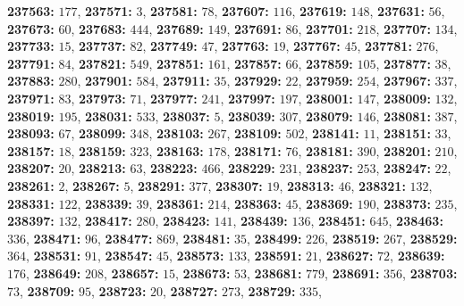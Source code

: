 \textsf{\bfseries 237563:} $177$, \textsf{\bfseries 237571:} $3$, \textsf{\bfseries 237581:} $78$, \textsf{\bfseries 237607:} $116$, \textsf{\bfseries 237619:} $148$, \textsf{\bfseries 237631:} $56$, \textsf{\bfseries 237673:} $60$, \textsf{\bfseries 237683:} $444$, \textsf{\bfseries 237689:} $149$, \textsf{\bfseries 237691:} $86$, \textsf{\bfseries 237701:} $218$, \textsf{\bfseries 237707:} $134$, \textsf{\bfseries 237733:} $15$, \textsf{\bfseries 237737:} $82$, \textsf{\bfseries 237749:} $47$, \textsf{\bfseries 237763:} $19$, \textsf{\bfseries 237767:} $45$, \textsf{\bfseries 237781:} $276$, \textsf{\bfseries 237791:} $84$, \textsf{\bfseries 237821:} $549$, \textsf{\bfseries 237851:} $161$, \textsf{\bfseries 237857:} $66$, \textsf{\bfseries 237859:} $105$, \textsf{\bfseries 237877:} $38$, \textsf{\bfseries 237883:} $280$, \textsf{\bfseries 237901:} $584$, \textsf{\bfseries 237911:} $35$, \textsf{\bfseries 237929:} $22$, \textsf{\bfseries 237959:} $254$, \textsf{\bfseries 237967:} $337$, \textsf{\bfseries 237971:} $83$, \textsf{\bfseries 237973:} $71$, \textsf{\bfseries 237977:} $241$, \textsf{\bfseries 237997:} $197$, \textsf{\bfseries 238001:} $147$, \textsf{\bfseries 238009:} $132$, \textsf{\bfseries 238019:} $195$, \textsf{\bfseries 238031:} $533$, \textsf{\bfseries 238037:} $5$, \textsf{\bfseries 238039:} $307$, \textsf{\bfseries 238079:} $146$, \textsf{\bfseries 238081:} $387$, \textsf{\bfseries 238093:} $67$, \textsf{\bfseries 238099:} $348$, \textsf{\bfseries 238103:} $267$, \textsf{\bfseries 238109:} $502$, \textsf{\bfseries 238141:} $11$, \textsf{\bfseries 238151:} $33$, \textsf{\bfseries 238157:} $18$, \textsf{\bfseries 238159:} $323$, \textsf{\bfseries 238163:} $178$, \textsf{\bfseries 238171:} $76$, \textsf{\bfseries 238181:} $390$, \textsf{\bfseries 238201:} $210$, \textsf{\bfseries 238207:} $20$, \textsf{\bfseries 238213:} $63$, \textsf{\bfseries 238223:} $466$, \textsf{\bfseries 238229:} $231$, \textsf{\bfseries 238237:} $253$, \textsf{\bfseries 238247:} $22$, \textsf{\bfseries 238261:} $2$, \textsf{\bfseries 238267:} $5$, \textsf{\bfseries 238291:} $377$, \textsf{\bfseries 238307:} $19$, \textsf{\bfseries 238313:} $46$, \textsf{\bfseries 238321:} $132$, \textsf{\bfseries 238331:} $122$, \textsf{\bfseries 238339:} $39$, \textsf{\bfseries 238361:} $214$, \textsf{\bfseries 238363:} $45$, \textsf{\bfseries 238369:} $190$, \textsf{\bfseries 238373:} $235$, \textsf{\bfseries 238397:} $132$, \textsf{\bfseries 238417:} $280$, \textsf{\bfseries 238423:} $141$, \textsf{\bfseries 238439:} $136$, \textsf{\bfseries 238451:} $645$, \textsf{\bfseries 238463:} $336$, \textsf{\bfseries 238471:} $96$, \textsf{\bfseries 238477:} $869$, \textsf{\bfseries 238481:} $35$, \textsf{\bfseries 238499:} $226$, \textsf{\bfseries 238519:} $267$, \textsf{\bfseries 238529:} $364$, \textsf{\bfseries 238531:} $91$, \textsf{\bfseries 238547:} $45$, \textsf{\bfseries 238573:} $133$, \textsf{\bfseries 238591:} $21$, \textsf{\bfseries 238627:} $72$, \textsf{\bfseries 238639:} $176$, \textsf{\bfseries 238649:} $208$, \textsf{\bfseries 238657:} $15$, \textsf{\bfseries 238673:} $53$, \textsf{\bfseries 238681:} $779$, \textsf{\bfseries 238691:} $356$, \textsf{\bfseries 238703:} $73$, \textsf{\bfseries 238709:} $95$, \textsf{\bfseries 238723:} $20$, \textsf{\bfseries 238727:} $273$, \textsf{\bfseries 238729:} $335$, 
